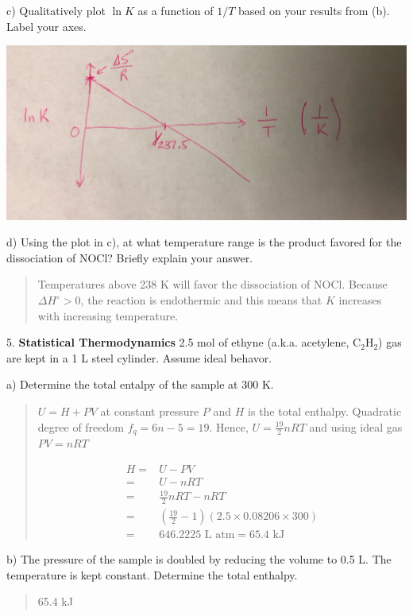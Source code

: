 \documentclass[11pt]{article}
\newcommand{\brian}[1]{
  {\begin{quote}
      \color{blue} #1
  \end{quote}}
}
\begin{document}
c) Qualitatively plot $\ln K$ as a function of $1/T$ based on your results from (b). {\color{blue}
  Label your axes.}

\begin{center}
  \includegraphics[scale=0.1]{vant_hoff.jpeg}
\end{center}

{\color{blue} d) Using the plot in c), at what temperature range is the product favored for the
  dissociation of NOCl? Briefly explain your answer.}

\brian{Temperatures above 238 K will favor the dissociation of NOCl. Because $\Delta H^\circ > 0$,
  the reaction is endothermic and this means that $K$ increases with increasing temperature.
}

5. \textbf{Statistical Thermodynamics} 2.5 mol of ethyne (a.k.a. acetylene, C$_2$H$_2$) gas
are kept in a 1 L steel cylinder. Assume ideal behavor.

a) Determine the total entalpy of the sample at 300 K.

\brian{$U = H + PV$ at constant pressure $P$ and $H$ is the total enthalpy. Quadratic degree
  of freedom $f_q = 6n-5 = 19$. Hence, $U = \frac{19}{2}nRT$ and using ideal gas $PV = nRT$

  \begin{align*}
    H = & U - PV \\
    = & U - nRT \\
    = & \frac{19}{2}nRT - nRT \\
    = & (\frac{19}{2} - 1)(2.5\times 0.08206 \times 300) \\
    = & 646.2225 \text{ L atm} = 65.4 \text{ kJ}
  \end{align*}  
}

b) The pressure of the sample is doubled by reducing the volume to 0.5 L. The
temperature is kept constant. Determine the total enthalpy.

\brian{65.4 kJ}
\end{document}
